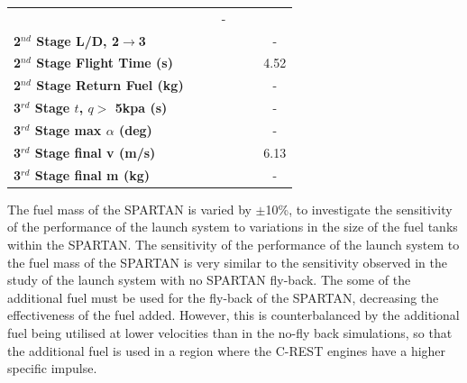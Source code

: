 \begin{table}[ht]
\begin{tabular}{l c c c c c c}
	& \secondthirdSeparationqmFuelOneHundredFive
	& \secondthirdSeparationqmFuelOneHundredTen
	& -
	\\
	\textbf{2$^{nd}$ Stage L/D, 2$\rightarrow$3}
	& \secondthirdSeparationLDmFuelNinety
	& \secondthirdSeparationLDmFuelNinetyFive
	& \secondthirdSeparationLDmFuelStandard
	& \secondthirdSeparationLDmFuelOneHundredFive
	& \secondthirdSeparationLDmFuelOneHundredTen
	& -
	\\
	\textbf{2$^{nd}$ Stage Flight Time (s)}
	& \secondFlightTimemFuelNinety
	& \secondFlightTimemFuelNinetyFive
	& \secondFlightTimemFuelStandard
	& \secondFlightTimemFuelOneHundredFive
	& \secondFlightTimemFuelOneHundredTen
	&4.52
	\\
	\textbf{2$^{nd}$ Stage Return Fuel (kg)}
	& \returnFuelmFuelNinety
	& \returnFuelmFuelNinetyFive
	& \returnFuelmFuelStandard
	& \returnFuelmFuelOneHundredFive
	& \returnFuelmFuelOneHundredTen
	& -
	\\
	\textbf{3$^{rd}$ Stage $t$, $q >$ 5kpa (s)}
	& \thirdqOverFivemFuelNinety
	& \thirdqOverFivemFuelNinetyFive
	& \thirdqOverFivemFuelStandard
	& \thirdqOverFivemFuelOneHundredFive
	& \thirdqOverFivemFuelOneHundredTen
	& -
	\\
	\textbf{3$^{rd}$ Stage max $\alpha$ (deg)}
	& \thirdmaxAoAmFuelNinety
	& \thirdmaxAoAmFuelNinetyFive
	& \thirdmaxAoAmFuelStandard
	& \thirdmaxAoAmFuelOneHundredFive
	& \thirdmaxAoAmFuelOneHundredTen
	& -
	\\
	\textbf{3$^{rd}$ Stage final v (m/s)}
	& \thirdcircvmFuelNinety
	& \thirdcircvmFuelNinetyFive
	& \thirdcircvmFuelStandard
	& \thirdcircvmFuelOneHundredFive
	& \thirdcircvmFuelOneHundredTen
	&6.13
	\\
	\textbf{3$^{rd}$ Stage final m (kg)}
	& \thirdcircmmFuelNinety
	& \thirdcircmmFuelNinetyFive
	& \thirdcircmmFuelStandard
	& \thirdcircmmFuelOneHundredFive
	& \thirdcircmmFuelOneHundredTen
	& -
	\\
	\hline 
\end{tabular} 
\end{table}
	
The fuel mass of the SPARTAN is varied by $\pm$10\%, to investigate the sensitivity of the performance of the launch system to variations in the size of the fuel tanks within the SPARTAN. 
The sensitivity of the performance of the launch system to the fuel mass of the SPARTAN is very similar to the sensitivity observed in the study of the launch system with no SPARTAN fly-back. 
The some of the additional fuel must be used for the fly-back of the SPARTAN, decreasing the effectiveness of the fuel added. However, this is counterbalanced by the additional fuel being utilised at lower velocities than in the no-fly back simulations, so that the additional fuel is used in a region where the C-REST engines have a higher specific impulse.

